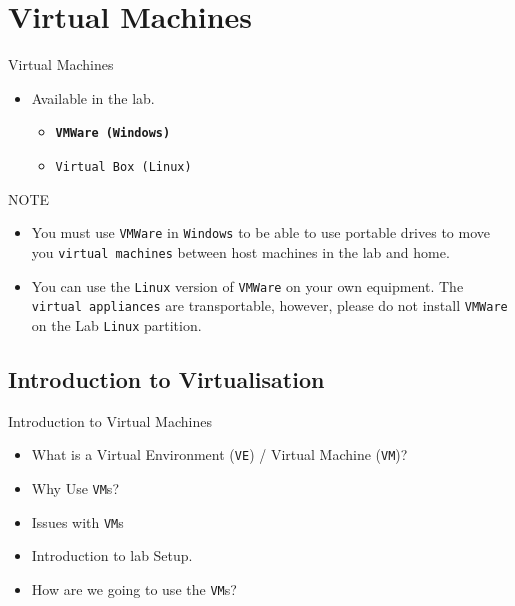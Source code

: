\documentclass[aspectratio=169]{beamer}
\begin{document}
\section{Virtual Machines}
\begin{frame}{Virtual Machines}
  \begin{itemize}
    \item Available in the lab.
      \begin{itemize}
        \item \textbf{\texttt{VMWare (Windows)}}
        \item \texttt{Virtual Box (Linux)}
      \end{itemize}
  \end{itemize}
  \begin{block}{NOTE}
    \begin{itemize}
      \item You must use \texttt{VMWare} in \texttt{Windows} to be able to use portable drives to move you \texttt{virtual machines} between host machines in the lab and home. 
      \item You can use the \texttt{Linux} version of \texttt{VMWare} on your own equipment. The \texttt{virtual appliances} are transportable, however, please do not install \texttt{VMWare} on the Lab \texttt{Linux} partition.
    \end{itemize}
  \end{block}
\end{frame}

\subsection{Introduction to Virtualisation}
\begin{frame}{Introduction to Virtual Machines}
  \begin{itemize}
    \item What is a Virtual Environment (\texttt{VE}) / Virtual Machine (\texttt{VM})?
    \item Why Use \texttt{VM}s?
    \item Issues with \texttt{VM}s
    \item Introduction to lab Setup.
    \item How are we going to use the \texttt{VM}s?
  \end{itemize}
\end{frame}
\end{document}
